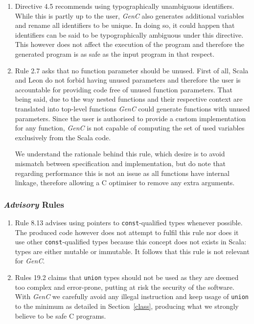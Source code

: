 \documentclass[a4paper,twoside]{article}
\newcommand{\InlineC}[1]{\lstinline[language=C99]|#1|}
\newcommand{\GenC}{\emph{GenC}\xspace}
\newcommand{\RefSec}[1]{Section~\ref{#1}}
\begin{document}
\begin{enumerate}

\item Directive 4.5 recommends using typographically unambiguous identifiers.
While this is partly up to the user, \GenC also generates additional variables
and rename all identifiers to be unique. In doing so, it could happen that
identifiers can be said to be typographically ambiguous under this directive.
This however does not affect the execution of the program and therefore the
generated program is as safe as the input program in that respect.

\item Rule 2.7 asks that no function parameter should be unused. First of all,
Scala and Leon do not forbid having unused parameters and therefore the user is
accountable for providing code free of unused function parameters. That being
said, due to the way nested functions and their respective context are
translated into top-level functions \GenC could generate functions with unused
parameters. Since the user is authorised to provide a custom implementation for
any function, \GenC is not capable of computing the set of used variables
exclusively from the Scala code.

We understand the rationale behind this rule, which desire is to avoid mismatch
between specification and implementation, but do note that regarding performance
this is not an issue as all functions have internal linkage, therefore allowing
a C optimiser to remove any extra arguments.

\end{enumerate}

\subsubsection*{\emph{Advisory} Rules}

\begin{enumerate}

\item Rule 8.13 advises using pointers to \InlineC{const}-qualified types
whenever possible. The produced code however does not attempt to fulfil this
rule nor does it use other \InlineC{const}-qualified types because this concept
does not exists in Scala: types are either mutable or immutable. It follows that
this rule is not relevant for \GenC.


\item Rules 19.2 claims that \InlineC{union} types should not be used as they
are deemed too complex and error-prone, putting at risk the security of the
software. With \GenC we carefully avoid any illegal instruction and keep usage
of \InlineC{union} to the minimum as detailed in \RefSec{class}, producing what
we strongly believe to be safe C programs.

\end{enumerate}
\end{document}
